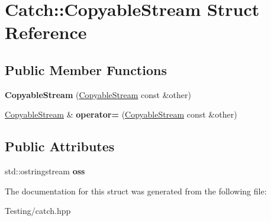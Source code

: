 \hypertarget{struct_catch_1_1_copyable_stream}{\section{Catch\-:\-:Copyable\-Stream Struct Reference}
\label{struct_catch_1_1_copyable_stream}
}
\subsection*{Public Member Functions}
\begin{DoxyCompactItemize}
\item 
\hypertarget{struct_catch_1_1_copyable_stream_a0e72dc16240653f52c17106f4bf34da8}{{\bfseries Copyable\-Stream} (\hyperlink{struct_catch_1_1_copyable_stream}{Copyable\-Stream} const \&other)}\label{struct_catch_1_1_copyable_stream_a0e72dc16240653f52c17106f4bf34da8}

\item 
\hypertarget{struct_catch_1_1_copyable_stream_a1760fa29b38011c5845171260bec0966}{\hyperlink{struct_catch_1_1_copyable_stream}{Copyable\-Stream} \& {\bfseries operator=} (\hyperlink{struct_catch_1_1_copyable_stream}{Copyable\-Stream} const \&other)}\label{struct_catch_1_1_copyable_stream_a1760fa29b38011c5845171260bec0966}

\end{DoxyCompactItemize}
\subsection*{Public Attributes}
\begin{DoxyCompactItemize}
\item 
\hypertarget{struct_catch_1_1_copyable_stream_ae123fb4d673e7d7a13a3c5f6bc5d426c}{std\-::ostringstream {\bfseries oss}}\label{struct_catch_1_1_copyable_stream_ae123fb4d673e7d7a13a3c5f6bc5d426c}

\end{DoxyCompactItemize}


The documentation for this struct was generated from the following file\-:\begin{DoxyCompactItemize}
\item 
Testing/catch.\-hpp\end{DoxyCompactItemize}
